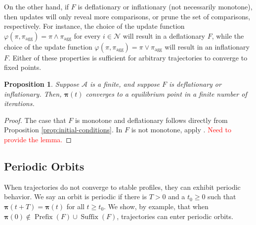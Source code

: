\documentclass[conference]{ieeeconf}
\newcommand{\N}{\mathcal{N}}
\newcommand{\A}{\mathcal{A}}
\newcommand{\profile}{\boldsymbol{\pi}}
\newcommand{\join}{\vee}
\newcommand{\meet}{\wedge}
\renewcommand{\geq}{\geqslant}
\DeclareMathOperator{\Pre}{Prefix}
\DeclareMathOperator{\Post}{Suffix}
\DeclareMathOperator{\lfp}{lfp}
\DeclareMathOperator{\gfp}{gfp}
\newtheorem{corollary}{Corollary}
\newtheorem{proposition}{Proposition}
\begin{document}

On the other hand, if $F$ is deflationary or inflationary (not necessarily monotone), then updates will only reveal more comparisons, or prune the set of comparisons, respectively. For instance, the choice of the update function $\varphi(\pi,\pi_{\text{agg}}) = \pi \meet \pi_{\text{agg}}$ for every $i \in \N$ will result in a deflationary $F$, while the choice of the update function 
$\varphi(\pi,\pi_{\text{agg}}) = \pi \join \pi_{\text{agg}}$ will result in an inflationary $F$. Either of these properties is sufficient for arbitrary trajectories to converge to fixed points.

\begin{proposition} \label{prop:inflationary}
     Suppose $\A$ is a finite, and suppose $F$ is deflationary or inflationary. Then, $\profile(t)$ converges to a equilibrium point in a finite number of iterations.
\end{proposition}
\begin{proof}
    The case that $F$ is monotone and deflationary follows directly from Proposition \ref{prop:initial-conditions}. In $F$ is not monotone, apply \cite[Theorem 12.19]{roman2008}. \textcolor{red}{Need to provide the lemma.}
\end{proof}

\textcolor{red}{}

\subsection{Periodic Orbits}
When trajectories do not converge to stable profiles, they can exhibit periodic behavior. We say an orbit is periodic if there is $T>0$ and a $t_0 \geq 0$ such that $\profile(t+T) = \profile(t)$ for all $t \geq t_0$. We show, by example, that when $\profile(0) \notin \Pre(F) \cup \Post(F)$, trajectories can enter periodic orbits.
\end{document}
